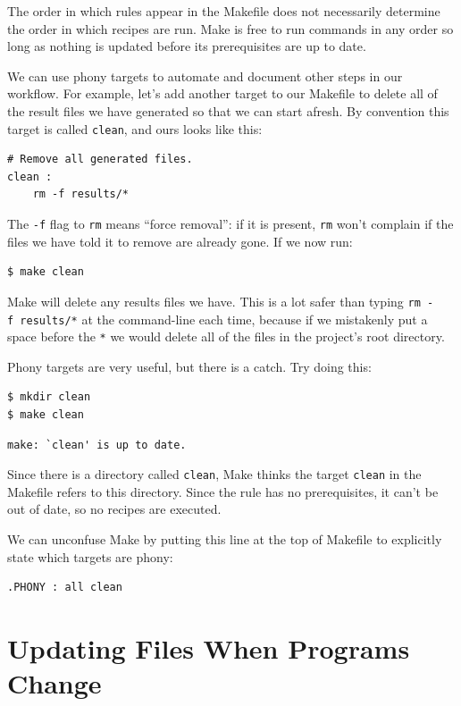 \documentclass[
]{krantz}
\begin{document}
The order in which rules appear in the Makefile
does not necessarily determine the order in which recipes are run.
Make is free to run commands in any order
so long as nothing is updated before its prerequisites are up to date.

We can use phony targets to automate and document other steps in our workflow.
For example,
let's add another target to our Makefile to delete all of the result files we have generated
so that we can start afresh.
By convention this target is called \texttt{clean},
and ours looks like this:

\begin{verbatim}
# Remove all generated files.
clean :
    rm -f results/*
\end{verbatim}

The \texttt{-f} flag to \texttt{rm} means ``force removal'':
if it is present,
\texttt{rm} won't complain if the files we have told it to remove are already gone.
If we now run:

\begin{verbatim}
$ make clean
\end{verbatim}

Make will delete any results files we have.
This is a lot safer than typing \texttt{rm\ -f\ results/*} at the command-line each time,
because if we mistakenly put a space before the \texttt{*}
we would delete all of the files in the project's root directory.

Phony targets are very useful,
but there is a catch.
Try doing this:

\begin{verbatim}
$ mkdir clean
$ make clean
\end{verbatim}

\begin{verbatim}
make: `clean' is up to date.
\end{verbatim}

Since there is a directory called \texttt{clean},
Make thinks the target \texttt{clean} in the Makefile refers to this directory.
Since the rule has no prerequisites,
it can't be out of date,
so no recipes are executed.

We can unconfuse Make by putting this line at the top of Makefile
to explicitly state which targets are phony:

\begin{verbatim}
.PHONY : all clean
\end{verbatim}

\hypertarget{automate-depend-programs}{%
\section{Updating Files When Programs Change}\label{automate-depend-programs}}
\end{document}
